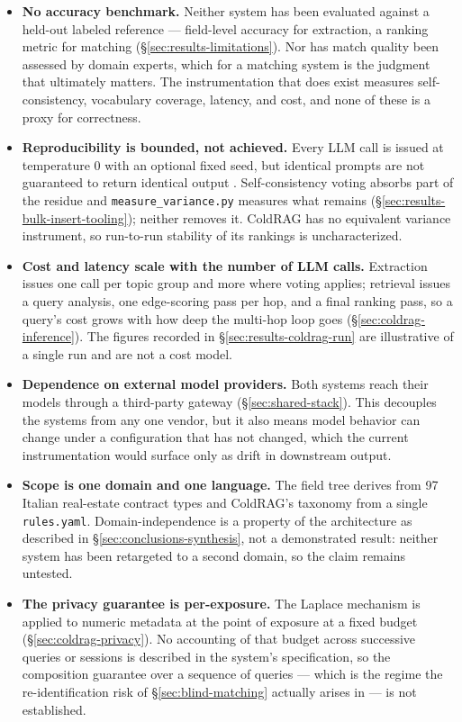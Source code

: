 \begin{itemize}
  \item \textbf{No accuracy benchmark.} Neither system has been evaluated against a held-out labeled reference — field-level accuracy for extraction, a ranking metric for matching (\S\ref{sec:results-limitations}). Nor has match quality been assessed by domain experts, which for a matching system is the judgment that ultimately matters. The instrumentation that does exist measures self-consistency, vocabulary coverage, latency, and cost, and none of these is a proxy for correctness.
  \item \textbf{Reproducibility is bounded, not achieved.} Every LLM call is issued at temperature 0 with an optional fixed seed, but identical prompts are not guaranteed to return identical output \citep{he2025defeating}. Self-consistency voting absorbs part of the residue and \texttt{measure\_variance.py} measures what remains (\S\ref{sec:results-bulk-insert-tooling}); neither removes it. ColdRAG has no equivalent variance instrument, so run-to-run stability of its rankings is uncharacterized.
  \item \textbf{Cost and latency scale with the number of LLM calls.} Extraction issues one call per topic group and more where voting applies; retrieval issues a query analysis, one edge-scoring pass per hop, and a final ranking pass, so a query's cost grows with how deep the multi-hop loop goes (\S\ref{sec:coldrag-inference}). The figures recorded in \S\ref{sec:results-coldrag-run} are illustrative of a single run and are not a cost model.
  \item \textbf{Dependence on external model providers.} Both systems reach their models through a third-party gateway (\S\ref{sec:shared-stack}). This decouples the systems from any one vendor, but it also means model behavior can change under a configuration that has not changed, which the current instrumentation would surface only as drift in downstream output.
  \item \textbf{Scope is one domain and one language.} The field tree derives from 97 Italian real-estate contract types and ColdRAG's taxonomy from a single \texttt{rules.yaml}. Domain-independence is a property of the architecture as described in \S\ref{sec:conclusions-synthesis}, not a demonstrated result: neither system has been retargeted to a second domain, so the claim remains untested.
  \item \textbf{The privacy guarantee is per-exposure.} The Laplace mechanism is applied to numeric metadata at the point of exposure at a fixed budget (\S\ref{sec:coldrag-privacy}). No accounting of that budget across successive queries or sessions is described in the system's specification, so the composition guarantee over a sequence of queries — which is the regime the re-identification risk of \S\ref{sec:blind-matching} actually arises in — is not established.
\end{itemize}

